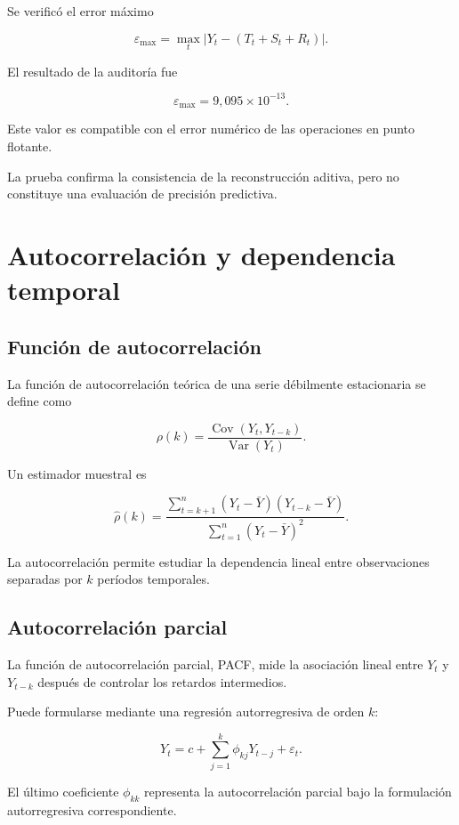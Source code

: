 \documentclass[11pt,a4paper]{article}
\begin{document}
Se verificó el error máximo

\[
\varepsilon_{\max}=
\max_t
\left|
Y_t-(T_t+S_t+R_t)
\right|.
\]

El resultado de la auditoría fue

\[
\varepsilon_{\max}
=9{,}095\times10^{-13}.
\]

Este valor es compatible con el error numérico
de las operaciones en punto flotante.

La prueba confirma la consistencia de la
reconstrucción aditiva, pero no constituye
una evaluación de precisión predictiva.


\section{Autocorrelación y dependencia temporal}

\subsection{Función de autocorrelación}

La función de autocorrelación teórica de una
serie débilmente estacionaria se define como

\[
\rho(k)=
\frac{\operatorname{Cov}(Y_t,Y_{t-k})}
{\operatorname{Var}(Y_t)}.
\]

Un estimador muestral es

\[
\widehat{\rho}(k)=
\frac{
\sum_{t=k+1}^{n}
(Y_t-\bar{Y})(Y_{t-k}-\bar{Y})
}{
\sum_{t=1}^{n}
(Y_t-\bar{Y})^2
}.
\]

La autocorrelación permite estudiar la dependencia
lineal entre observaciones separadas por $k$
períodos temporales.

\subsection{Autocorrelación parcial}

La función de autocorrelación parcial, PACF,
mide la asociación lineal entre $Y_t$ y $Y_{t-k}$
después de controlar los retardos intermedios.

Puede formularse mediante una regresión
autorregresiva de orden $k$:

\[
Y_t=
c+\sum_{j=1}^{k}
\phi_{kj}Y_{t-j}
+\varepsilon_t.
\]

El último coeficiente $\phi_{kk}$ representa
la autocorrelación parcial bajo la formulación
autorregresiva correspondiente.
\end{document}

